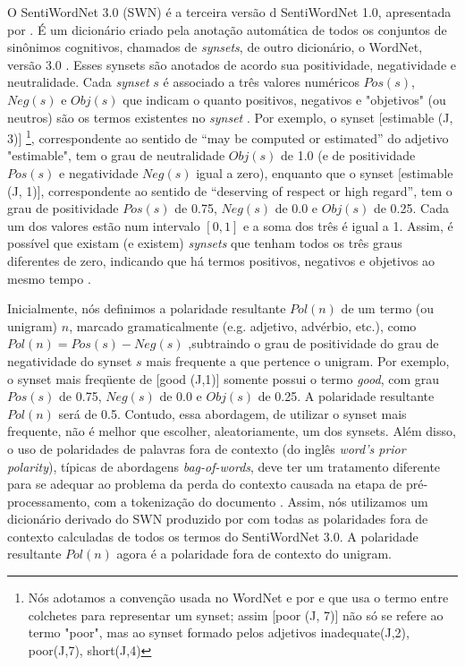 O SentiWordNet 3.0 (SWN) é a terceira versão d SentiWordNet 1.0, apresentada por \cite{esuli2006sentiwordnet}. É um dicionário criado pela anotação automática de todos os conjuntos de sinônimos cognitivos, chamados de \textit{synsets}, de outro dicionário, o WordNet, versão 3.0 \cite{fellbaum2005wordnet}. Esses synsets são anotados de acordo sua positividade, negatividade e neutralidade. Cada \textit{synset} $s$ é associado a três valores numéricos $Pos(s)$, $Neg(s)$ e $Obj(s)$ que indicam o quanto positivos, negativos e "objetivos" (ou neutros) são os termos existentes no \textit{synset} \cite{baccianella2010sentiwordnet}.
Por exemplo, o synset [estimable (J, 3)] \footnote{Nós adotamos a convenção usada no WordNet e por \cite{esuli2006sentiwordnet} e \cite{baccianella2010sentiwordnet} que usa o termo entre colchetes para representar um synset; assim [poor (J, 7)] não só se refere ao termo "poor", mas ao synset formado pelos adjetivos {inadequate(J,2), poor(J,7), short(J,4)}}, correspondente ao sentido de “may be computed or estimated” do adjetivo "estimable", tem o grau de neutralidade $Obj(s)$ de 1.0 (e de positividade $Pos(s)$ e negatividade $Neg(s)$ igual a zero), enquanto que o synset [estimable (J, 1)], correspondente ao sentido de “deserving of respect or high regard”, tem o grau de positividade $Pos(s)$ de 0.75, $Neg(s)$ de 0.0 e $Obj(s)$ de 0.25. Cada um dos valores estão num intervalo $[0, 1]$ e a soma dos três é igual a 1. Assim, é possível que existam (e existem) \textit{synsets} que tenham todos os três graus diferentes de zero, indicando que há termos positivos, negativos e objetivos ao mesmo tempo \cite{esuli2006sentiwordnet}.

Inicialmente, nós definimos a polaridade resultante $Pol(n)$ de um termo (ou unigram) $n$, marcado gramaticalmente (e.g. adjetivo, advérbio, etc.), como $Pol(n) = Pos(s) - Neg(s)$ ,subtraindo o grau de positividade do grau de negatividade do synset $s$ mais frequente a que pertence o unigram. Por exemplo, o synset mais freqüente de [good (J,1)] somente possui o termo \textit{good}, com grau $Pos(s)$ de 0.75, $Neg(s)$ de 0.0 e $Obj(s)$ de 0.25. A polaridade resultante $Pol(n)$ será de 0.5. Contudo, essa abordagem, de utilizar o synset mais frequente, não é melhor que escolher, aleatoriamente, um dos synsets. Além disso, o uso de polaridades de palavras fora de contexto (do inglês \textit{word’s prior polarity}), típicas de abordagens \textit{bag-of-words}, deve ter um tratamento diferente para se adequar ao problema da perda do contexto causada na etapa de pré-processamento, com a tokenização do documento  \cite{guerini2013sentiment}. Assim, nós utilizamos um dicionário derivado do SWN produzido por  \cite{guerini2013sentiment} com todas as polaridades fora de contexto calculadas de todos os termos do SentiWordNet 3.0. A polaridade resultante $Pol(n)$ agora é a polaridade fora de contexto do unigram. 


